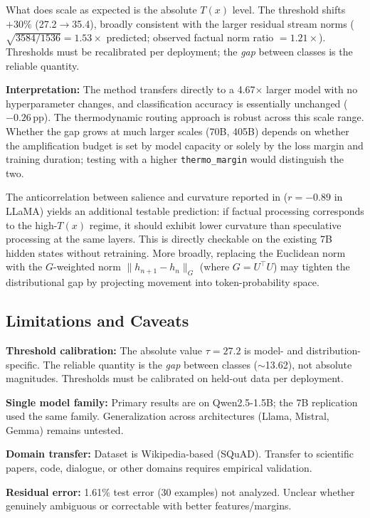 \documentclass[11pt,a4paper]{article}
\begin{document}
What does scale as expected is the absolute $T(x)$ level. The threshold shifts $+30\%$ (27.2$\rightarrow$35.4), broadly consistent with the larger residual stream norms ($\sqrt{3584/1536} = 1.53\times$ predicted; observed factual norm ratio $= 1.21\times$). Thresholds must be recalibrated per deployment; the \emph{gap} between classes is the reliable quantity.

\textbf{Interpretation:} The method transfers directly to a 4.67$\times$ larger model with no hyperparameter changes, and classification accuracy is essentially unchanged ($-0.26$\,pp). The thermodynamic routing approach is robust across this scale range. Whether the gap grows at much larger scales (70B, 405B) depends on whether the amplification budget is set by model capacity or solely by the loss margin and training duration; testing with a higher \texttt{thermo\_margin} would distinguish the two.

The anticorrelation between salience and curvature reported in \citet{manson2025curved} ($r = -0.89$ in LLaMA) yields an additional testable prediction: if factual processing corresponds to the high-$T(x)$ regime, it should exhibit lower curvature than speculative processing at the same layers. This is directly checkable on the existing 7B hidden states without retraining. More broadly, replacing the Euclidean norm with the $G$-weighted norm $\|h_{n+1} - h_n\|_G$ (where $G = U^\top U$) may tighten the distributional gap by projecting movement into token-probability space.

\subsection{Limitations and Caveats}

\textbf{Threshold calibration:} The absolute value $\tau = 27.2$ is model- and distribution-specific. The reliable quantity is the \emph{gap} between classes ($\sim$13.62), not absolute magnitudes. Thresholds must be calibrated on held-out data per deployment.

\textbf{Single model family:} Primary results are on Qwen2.5-1.5B; the 7B replication used the same family. Generalization across architectures (Llama, Mistral, Gemma) remains untested.

\textbf{Domain transfer:} Dataset is Wikipedia-based (SQuAD). Transfer to scientific papers, code, dialogue, or other domains requires empirical validation.

\textbf{Residual error:} 1.61\% test error (30 examples) not analyzed. Unclear whether genuinely ambiguous or correctable with better features/margins.
\end{document}
